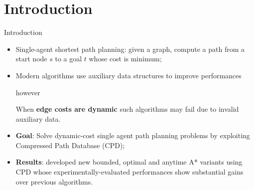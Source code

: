 \section*{Introduction}

\begin{frame}{Introduction}
    \begin{itemize}
        \item Single-agent shortest path planning: given a graph, compute a path from a start node $s$ to a goal $t$ whose cost is minimum;
        \item Modern algorithms use auxiliary data structures to improve performances
        
        \begin{center}
            however
        \end{center}
        
        When \textbf{edge costs are dynamic} such algorithms may fail due to invalid auxiliary data.

        \item \textbf{Goal}: Solve dynamic-cost single agent path planning problems by exploiting Compressed Path Database (CPD);
        \item \textbf{Results}: developed new bounded, optimal and anytime A* variants using CPD whose experimentally-evaluated performances show substantial gains over previous algorithms.
    \end{itemize}
\end{frame}

